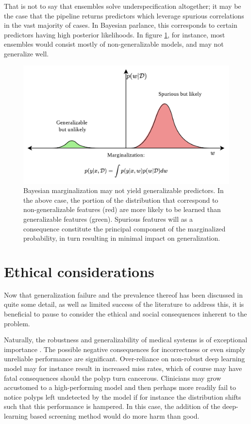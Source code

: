 That is not to say that ensembles solve underspecification altogether; it may be the case that the pipeline returns predictors which leverage spurious correlations in the vast majority of cases. In Bayesian parlance, this corresponds to certain predictors having high posterior likelihoods. In figure \ref{fig:bayesian_generalization}, for instance, most ensembles would consist mostly of non-generalizable models, and may not generalize well. 
\begin{figure}
    \centering
    \includegraphics[width=\linewidth]{illustrations/bayesian.png}
    \caption[Bayesian Marginalization and Generalization]{Bayesian marginalization may not yield generalizable predictors. In the above case, the portion of the distribution that correspond to non-generalizable features (red) are more likely to be learned than generalizable features (green). Spurious features will as a consequence constitute the principal component of the marginalized probability, in turn resulting in minimal impact on generalization.}
    \label{fig:bayesian_generalization}
\end{figure}

\section{Ethical considerations}
    Now that generalization failure and the prevalence thereof has been discussed in quite some detail, as well as limited success of the literature to address this, it is beneficial to pause to consider the ethical and social consequences inherent to the problem. 
    
    Naturally, the robustness and generalizability of medical systems is of exceptional importance \cite{ethics_1}. The possible negative consequences for incorrectness or even simply unreliable performance are significant. Over-reliance on non-robust deep learning model may for instance result in increased miss rates, which of course may have fatal consequences should the polyp turn cancerous. Clinicians may grow accustomed to a high-performing model and then perhaps more readily fail to notice polyps left undetected by the model if for instance the distribution shifts such that this performance is hampered. In this case, the addition of the deep-learning based screening method would do more harm than good. 
    
